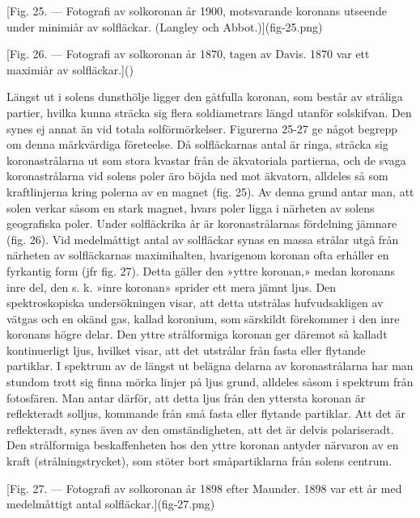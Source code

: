 \documentclass[a4paper, 12pt, oneside, swedish]{article}
\begin{document}
[Fig. 25. --- Fotografi av solkoronan år 1900, motsvarande koronans utseende under minimiår av solfläckar. (Langley och Abbot.)](fig-25.png)

[Fig. 26. --- Fotografi av solkoronan år 1870, tagen av Davis. 1870 var ett maximiår av solfläckar.]()

Längst ut i solens dunsthölje ligger den gåtfulla koronan, som består av stråliga partier, hvilka kunna sträcka sig flera soldiametrars längd utanför solskifvan. Den synes ej annat än vid totala solförmörkelser. Figurerna 25-27 ge något begrepp om denna märkvärdiga företeelse. Då solfläckarnas antal är ringa, sträcka sig koronastrålarna ut som stora kvastar från de äkvatoriala partierna, och de svaga koronastrålarna vid solens poler äro böjda ned mot äkvatorn, alldeles så som kraftlinjerna kring polerna av en magnet (fig. 25). Av denna grund antar man, att solen verkar såsom en stark magnet, hvars poler ligga i närheten av solens geografiska poler. Under solfläckrika år är koronastrålarnas fördelning jämnare (fig. 26). Vid medelmåttigt antal av solfläckar synas en massa strålar utgå från närheten av solfläckarnas maximihalten, hvarigenom koronan ofta erhåller en fyrkantig form (jfr fig. 27). Detta gäller den »yttre koronan,» medan koronans inre del, den s. k. »inre koronan» sprider ett mera jämnt ljus. Den spektroskopiska undersökningen visar, att detta utstrålas hufvudsakligen av vätgas och en okänd gas, kallad koronium, som särskildt förekommer i den inre koronans högre delar. Den yttre strålformiga koronan ger däremot så kalladt kontinuerligt ljus, hvilket visar, att det utstrålar från fasta eller flytande partiklar. I spektrum av de längst ut belägna delarna av koronastrålarna har man stundom trott sig finna mörka linjer på ljus grund, alldeles såsom i spektrum från fotosfären. Man antar därför, att detta ljus från den yttersta koronan är reflekteradt solljus, kommande från små fasta eller flytande partiklar. Att det är reflekteradt, synes även av den omständigheten, att det är delvis polariseradt. Den strålformiga beskaffenheten hos den yttre koronan antyder närvaron av en kraft (strålningstrycket), som stöter bort småpartiklarna från solens centrum.

[Fig. 27. --- Fotografi av solkoronan år 1898 efter Maunder. 1898 var ett år med medelmåttigt antal solfläckar.](fig-27.png)
\end{document}
